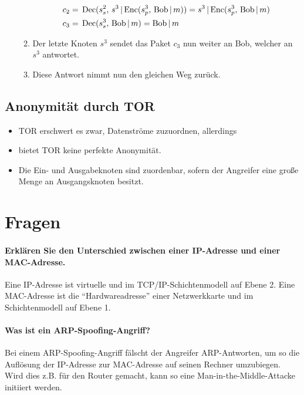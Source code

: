 \begin{itemize}
\begin{enumerate}
\begin{align*}
			                	c_2 &=\, \textrm{Dec}(s^2_s,\, s^3 \,\vert\, \textrm{Enc}(s^3_p,\, \text{Bob} \,\vert\, m)) = s^3 \,\vert\, \textrm{Enc}(s^3_p,\, \text{Bob} \,\vert\, m) \\
			                	c_3 &=\, \textrm{Dec}(s^3_s,\, \text{Bob} \,\vert\, m) = \text{Bob} \,\vert\, m \\
		                	\end{align*}
		                \item Der letzte Knoten \(s^3\) sendet das Paket \(c_3\) nun weiter an Bob, welcher an \(s^3\) antwortet.
		                \item Diese Antwort nimmt nun den gleichen Weg zurück.
                	\end{enumerate}
            \end{itemize}

        \subsection{Anonymität durch TOR}
            \begin{itemize}
            	\item TOR erschwert es zwar, Datenströme zuzuordnen, allerdings
            	\item bietet TOR keine perfekte Anonymität.
            	\item Die Ein- und Ausgabeknoten sind zuordenbar, sofern der Angreifer eine große Menge an Ausgangsknoten besitzt.
            \end{itemize}

    \section{Fragen}
		\paragraph{Erklären Sie den Unterschied zwischen einer IP-Adresse und einer MAC-Adresse.}
		Eine IP-Adresse ist virtuelle und im TCP/IP-Schichtenmodell auf Ebene 2. Eine MAC-Adresse ist die \enquote{Hardwareadresse} einer Netzwerkkarte und im Schichtenmodell auf Ebene 1.
		
		\paragraph{Was ist ein ARP-Spoofing-Angriff?}
		Bei einem ARP-Spoofing-Angriff fälscht der Angreifer ARP-Antworten, um so die Auflösung der IP-Adresse zur MAC-Adresse auf seinen Rechner umzubiegen. Wird dies z.B. für den Router gemacht, kann so eine Man-in-the-Middle-Attacke initiiert werden.
		
